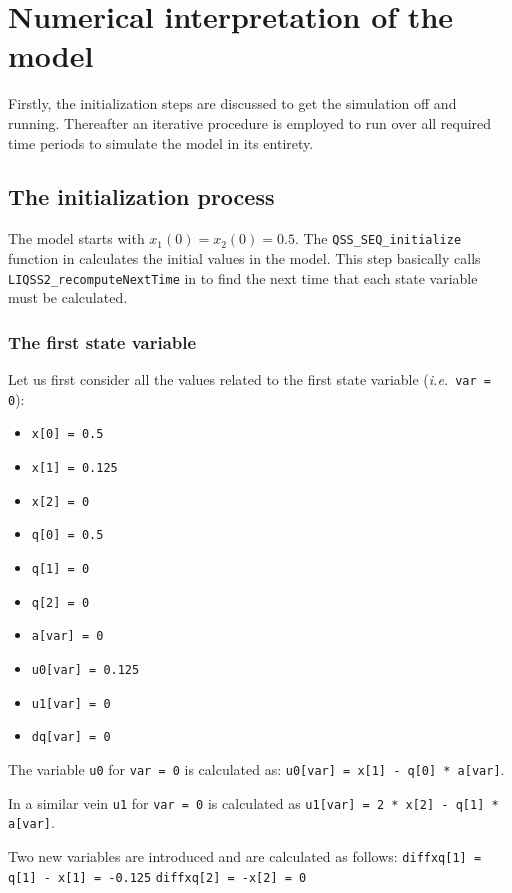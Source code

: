 \documentclass[10pt]{article}
\begin{document}
\section{Numerical interpretation of the model}

Firstly, the initialization steps are discussed to get the simulation off and running. Thereafter an iterative procedure is employed to run over all required time periods to simulate the model in its entirety.

\subsection{The initialization process}

The model starts with $x_1(0) = x_2(0) = 0.5$. The {\tt{QSS\_SEQ\_initialize}} function in {} calculates the initial values in the model. This step basically calls {\tt{LIQSS2\_recomputeNextTime}} in {} to find the next time that each state variable must be calculated.

\subsubsection{The first state variable}
Let us first consider all the values related to the first state variable ({\em i.e.}\ {\tt{var = 0}}):
\begin{itemize}
 \item {\tt{x[0] = 0.5}}
 \item {\tt{x[1] = 0.125}}
 \item {\tt{x[2] = 0}}
  \item {\tt{q[0] = 0.5}}
 \item {\tt{q[1] = 0}}
 \item {\tt{q[2] = 0}}
  \item {\tt{a[var] = 0}}
  \item {\tt{u0[var] = 0.125}}
 \item {\tt{u1[var] = 0}}
 \item {\tt{dq[var] = 0}}
\end{itemize}

The variable {\tt{u0}} for {\tt{var = 0}} is calculated as:  {\tt{u0[var] = x[1] - q[0] * a[var]}}.

In a similar vein {\tt{u1}} for {\tt{var = 0}} is calculated as {\tt{u1[var] = 2 * x[2] - q[1] * a[var]}}.

Two new variables are introduced and are calculated as follows:
{\tt{diffxq[1] = q[1] - x[1] = -0.125}}
{\tt{diffxq[2] = -x[2] = 0}}
\end{document}
